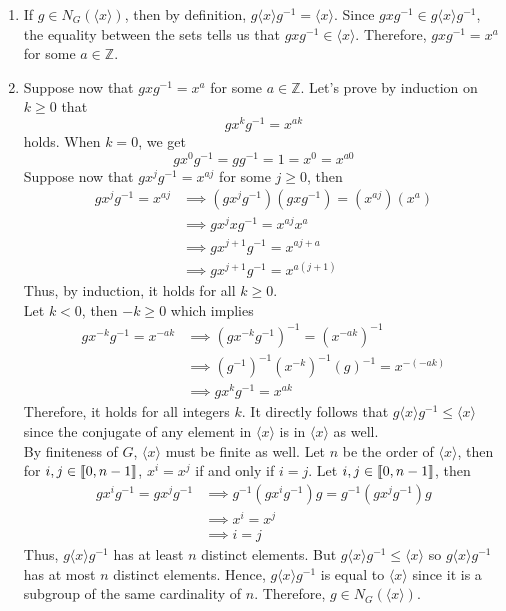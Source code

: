 \begin{solution}
    \begin{enumerate}[label = \textbf{(\alph*)}]
        \item If $g \in N_G(\langle x \rangle)$, then by definition, $g \langle x \rangle g^{-1} = \langle x \rangle$. Since $gxg^{-1} \in g \langle x \rangle g^{-1}$, the equality between the sets tells us that $gxg^{-1} \in \langle x \rangle$. Therefore, $gxg^{-1} = x^a$ for some $a \in \mathbb{Z}$.
        \item Suppose now that $gxg^{-1} = x^a$ for some $a \in \mathbb{Z}$. Let's prove by induction on $k \geq 0$ that 
        $$gx^kg^{-1} = x^{ak}$$
        holds. When $k=0$, we get
        $$gx^0g^{-1} = gg^{-1} = 1 = x^0 = x^{a0}$$
        Suppose now that $gx^jg^{-1} = x^{aj}$ for some $j \geq 0$, then
        \begin{align*}
            gx^jg^{-1} = x^{aj} &\implies (gx^jg^{-1})(gxg^{-1}) = (x^{aj})(x^a) \\
            &\implies gx^jxg^{-1} = x^{aj}x^a \\
            &\implies gx^{j+1}g^{-1} = x^{aj+a} \\
            &\implies gx^{j+1}g^{-1} = x^{a(j+1)}
        \end{align*}
        Thus, by induction, it holds for all $k \geq 0$. \\ Let $k < 0$, then $-k \geq 0$ which implies
        \begin{align*}
            gx^{-k}g^{-1} = x^{-ak} &\implies (gx^{-k}g^{-1})^{-1} = (x^{-ak})^{-1} \\
            &\implies (g^{-1})^{-1}(x^{-k})^{-1}(g)^{-1} = x^{-(-ak)} \\
            &\implies gx^kg^{-1} = x^{ak}
        \end{align*}
        Therefore, it holds for all integers $k$. It directly follows that $g\langle x \rangle g^{-1} \leq \langle x \rangle$ since the conjugate of any element in $\langle x \rangle$ is in $\langle x \rangle$ as well. \\
        By finiteness of $G$, $\langle x \rangle$ must be finite as well. Let $n$ be the order of $\langle x \rangle$, then for $i,j \in \llbracket 0 , n-1 \rrbracket$, $x^i=x^j$ if and only if $i=j$. Let $i,j \in \llbracket 0 , n-1 \rrbracket$, then 
        \begin{align*}
            gx^ig^{-1} = gx^jg^{-1} &\implies g^{-1}(gx^ig^{-1})g = g^{-1}(gx^jg^{-1})g\\
            &\implies x^i = x^j \\
            &\implies i = j
        \end{align*}
        Thus, $g\langle x \rangle g^{-1}$ has at least $n$ distinct elements. But $g\langle x \rangle g^{-1} \leq \langle x \rangle$ so $g\langle x \rangle g^{-1}$ has at most $n$ distinct elements. Hence, $g\langle x \rangle g^{-1}$ is equal to $\langle x \rangle$ since it is a subgroup of the same cardinality of $n$. Therefore, $g \in N_G(\langle x \rangle)$.\\
    \end{enumerate}
\end{solution}

